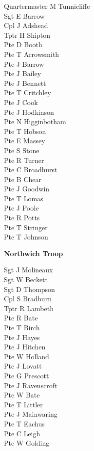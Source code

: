 \begin{multicols}{2}
  \small
  \noindent
  Quartermaster M Tunnicliffe \\
  Sgt E Barrow \\
  Cpl J Adshead \\
  Tptr H Shipton \\
  Pte D Booth \\
  Pte T Arrowsmith \\
  Pte J Barrow \\
  Pte J Bailey \\
  Pte J Bennett \\
  Pte T Critchley \\
  Pte J Cook \\
  Pte J Hodkinson \\
  Pte N Higginbotham \\
  Pte T Hobson \\
  Pte E Massey \\
  Pte S Stone \\
  Pte R Turner \\
  Pte C Broadhurst \\
  Pte B Chear \\
  Pte J Goodwin \\
  Pte T Lomas \\
  Pte J Poole \\
  Pte R Potts \\
  Pte T Stringer \\
  Pte T Johnson \\
\end{multicols}

\vspace*{10mm}

\begin{center}
  \Large
  \textbf{Northwich Troop}
\end{center}

\vspace*{10mm}

\begin{multicols}{2}
  \small
  \noindent
  Sgt J Molineaux \\
  Sgt W Beckett \\
  Sgt D Thompson \\
  Cpl S Bradburn \\
  Tptr R Lambeth \\
  Pte R Bate \\
  Pte T Birch \\
  Pte J Hayes \\
  Pte J Hitchen \\
  Pte W Holland \\
  Pte J Lovatt \\
  Pte G Prescott \\
  Pte J Ravenscroft \\
  Pte W Bate \\
  Pte T Littler \\
  Pte J Mainwaring \\
  Pte T Eachus \\
  Pte C Leigh \\
  Pte W Golding \\
\end{multicols}
